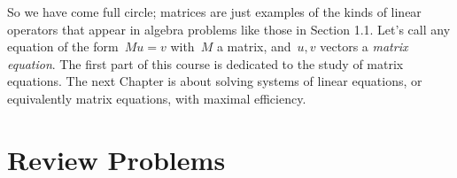 
So we have come full circle; matrices are just examples of the kinds of linear operators that appear in algebra problems like those in 
Section 1.1. 
Let's call any equation of the form~$Mu=v$ with~$M$ a matrix, and~$u,v$ vectors a {\itshape matrix equation}. The first part of this course is dedicated to the study of matrix equations. 
The next Chapter is about solving systems of linear equations, or equivalently matrix equations, with maximal efficiency.

%
%








\section{Review Problems}


\newpage